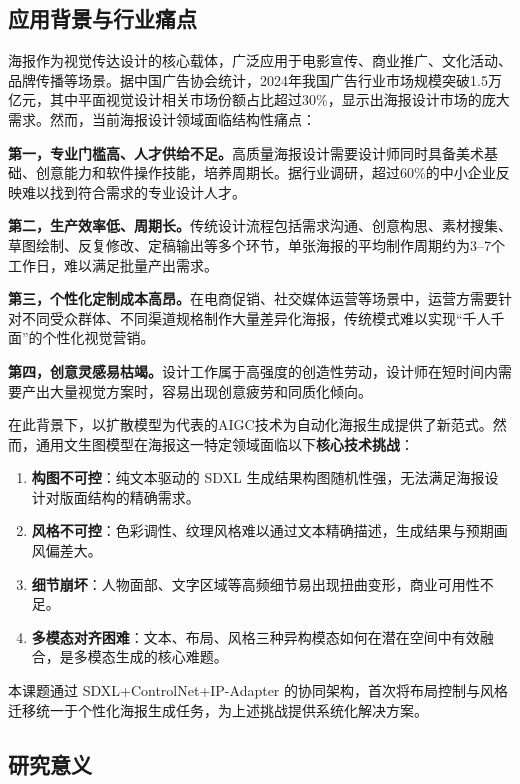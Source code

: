 \documentclass[10pt,a4paper]{article}
\begin{document}
\subsection{应用背景与行业痛点}

海报作为视觉传达设计的核心载体，广泛应用于电影宣传、商业推广、文化活动、品牌传播等场景。据中国广告协会统计，2024年我国广告行业市场规模突破1.5万亿元，其中平面视觉设计相关市场份额占比超过30\%，显示出海报设计市场的庞大需求。然而，当前海报设计领域面临结构性痛点：

\textbf{第一，专业门槛高、人才供给不足。}高质量海报设计需要设计师同时具备美术基础、创意能力和软件操作技能，培养周期长。据行业调研，超过60\%的中小企业反映难以找到符合需求的专业设计人才。

\textbf{第二，生产效率低、周期长。}传统设计流程包括需求沟通、创意构思、素材搜集、草图绘制、反复修改、定稿输出等多个环节，单张海报的平均制作周期约为3--7个工作日，难以满足批量产出需求。

\textbf{第三，个性化定制成本高昂。}在电商促销、社交媒体运营等场景中，运营方需要针对不同受众群体、不同渠道规格制作大量差异化海报，传统模式难以实现``千人千面''的个性化视觉营销。

\textbf{第四，创意灵感易枯竭。}设计工作属于高强度的创造性劳动，设计师在短时间内需要产出大量视觉方案时，容易出现创意疲劳和同质化倾向。

在此背景下，以扩散模型为代表的AIGC技术为自动化海报生成提供了新范式。然而，通用文生图模型在海报这一特定领域面临以下\textbf{核心技术挑战}：

\begin{enumerate}[itemsep=0pt,topsep=2pt]
    \item \textbf{构图不可控}：纯文本驱动的 SDXL 生成结果构图随机性强，无法满足海报设计对版面结构的精确需求。
    \item \textbf{风格不可控}：色彩调性、纹理风格难以通过文本精确描述，生成结果与预期画风偏差大。
    \item \textbf{细节崩坏}：人物面部、文字区域等高频细节易出现扭曲变形，商业可用性不足。
    \item \textbf{多模态对齐困难}：文本、布局、风格三种异构模态如何在潜在空间中有效融合，是多模态生成的核心难题。
\end{enumerate}

本课题通过 SDXL+ControlNet+IP-Adapter 的协同架构，首次将布局控制与风格迁移统一于个性化海报生成任务，为上述挑战提供系统化解决方案。

\subsection{研究意义}
\end{document}

